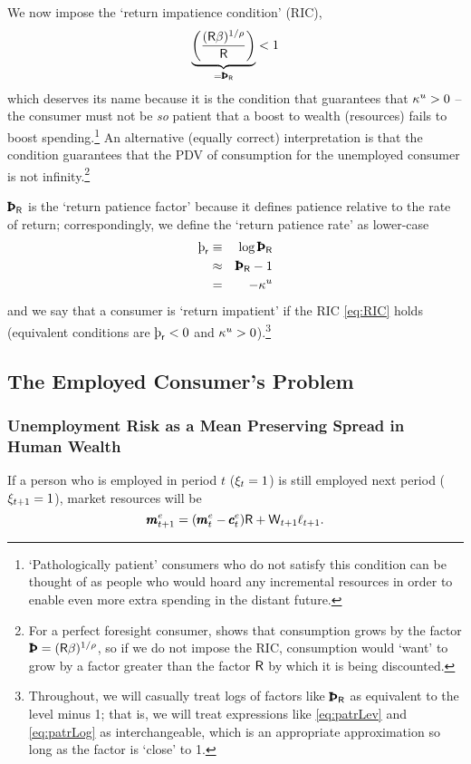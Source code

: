 \documentclass{handout}
\begin{document}
\indent We now impose the `return impatience condition' (RIC),
\begin{eqnarray}
  \underbrace{\left(\frac{(\Rfree \Discount)^{1/\CRRA}}{\Rfree}\right)}_{= \PatR} < 1 \label{eq:RIC}
\end{eqnarray}
which deserves its name because it is the condition that guarantees that $\kappa^{u}
> 0$ -- the consumer must not be {\it so} patient that a boost to
wealth (resources) fails to boost spending.\footnote{`Pathologically patient' consumers who do not satisfy this condition can be thought of as people who would hoard any incremental resources in order to enable even more extra spending in the distant future.}
An alternative (equally correct)
interpretation is that the condition guarantees that the PDV of
consumption for the unemployed consumer is not infinity.\footnote{For a perfect
foresight consumer,  shows that consumption grows by the factor
$\Pat = (\Rfree\Discount)^{1/\CRRA}$, so if we do not impose the RIC, consumption would `want' to grow by
a factor greater than the factor $\mathsf{R}$ by which it is being
discounted.}

$\PatR$ is the `return patience factor' because it defines patience
relative to the rate of return; correspondingly, we define the `return
patience rate' as lower-case
\begin{eqnarray}
   \patr & \equiv &  \log \PatR \label{eq:patrLog}
\\ & \approx &\PatR - 1 \label{eq:patrLev}
\\ & = & -\MPCU
\end{eqnarray}
and we say that a consumer is `return impatient' if the RIC \eqref{eq:RIC} holds (equivalent conditions are $\patr < 0$ and $\kappa^{u} > 0$).\footnote{Throughout, we will casually treat logs of factors like $\PatR$ as equivalent to the level minus 1; that is, we will treat expressions like \eqref{eq:patrLev} and \eqref{eq:patrLog} as interchangeable, which is an appropriate approximation so long as the factor is `close' to 1.}

\subsection{The Employed Consumer's Problem}

\subsubsection{Unemployment Risk as a Mean Preserving Spread in Human Wealth} \label{subsubsec:uMPS}
If a person who is employed in period $t$ ($\xi_{t}=1$) is still employed next
period ($\xi_{t+1}=1$), market resources will be
\begin{equation}
\pmb{m}^{e}_{t+1} = (\pmb{m}^{e}_{t}-\pmb{c}^{e}_{t})\mathsf{R}+\mathsf{W}_{t+1}\ell_{t+1}. \label{eq:Metp1}
\end{equation}
\end{document}
